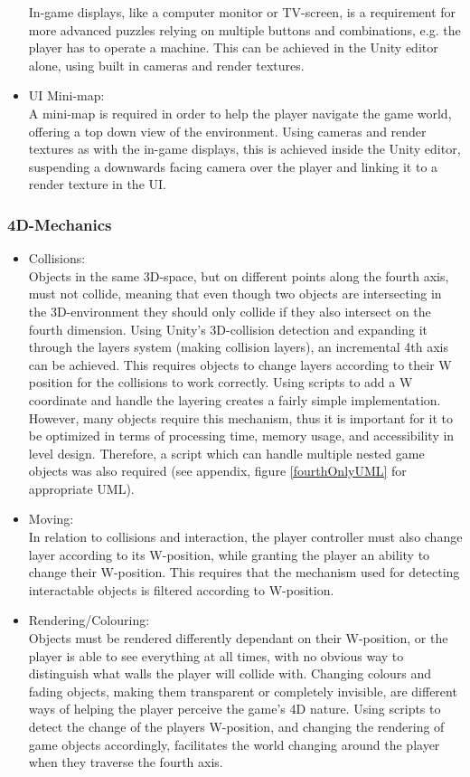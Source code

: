 \begin{itemize}
	In-game displays, like a computer monitor or TV-screen, is a requirement for more advanced puzzles relying on multiple buttons and combinations, e.g. the player has to operate a machine. This can be achieved in the Unity editor alone, using built in cameras and render textures.
	\item UI Mini-map:\\
	 A mini-map is required in order to help the player navigate the game world, offering a top down view of the environment. Using cameras and render textures as with the in-game displays, this is achieved inside the Unity editor, suspending a downwards facing camera over the player and linking it to a render texture in the UI.
\end{itemize}

\subsubsection{4D-Mechanics}
\begin{itemize}
	\item Collisions:\\
	Objects in the same 3D-space, but on different points along the fourth axis, must not collide, meaning that even though two objects are intersecting in the 3D-environment they should only collide if they also intersect on the fourth dimension. Using Unity's 3D-collision detection and expanding it through the layers system (making collision layers), an incremental 4th axis can be achieved. This requires objects to change layers according to their W position for the collisions to work correctly. Using scripts to add a W coordinate and handle the layering creates a fairly simple implementation. However, many objects require this mechanism, thus it is important for it to be optimized in terms of processing time, memory usage, and accessibility in level design. Therefore, a script which can handle multiple nested game objects was also required (see appendix, figure \ref{fourthOnlyUML} for appropriate UML). 
	\item Moving:\\
	In relation to collisions and interaction, the player controller must also change layer according to its W-position, while granting the player an ability to change their W-position. This requires that the mechanism used for detecting interactable objects is filtered according to W-position.
	\item Rendering/Colouring:\\
	Objects must be rendered differently dependant on their W-position, or the player is able to see everything at all times, with no obvious way to distinguish what walls the player will collide with. Changing colours and fading objects, making them transparent or completely invisible, are different ways of helping the player perceive the game's 4D nature. Using scripts to detect the change of the players W-position, and changing the rendering of game objects accordingly, facilitates the world changing around the player when they traverse the fourth axis.
\end{itemize}